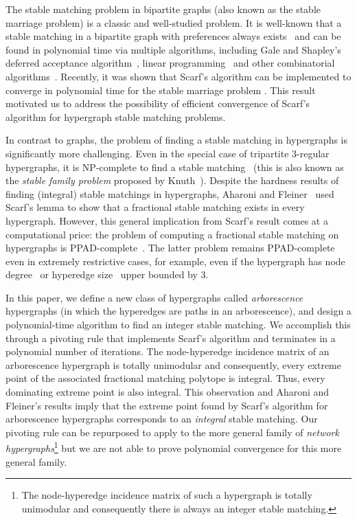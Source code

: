 \documentclass[11pt]{article}
\begin{document}
The stable matching problem in bipartite graphs (also known as the stable marriage problem) is a classic and well-studied problem. It is well-known that a stable matching in a bipartite graph with preferences always exists~\cite{gale1962college} and can be found in polynomial time via multiple algorithms, including Gale and Shapley's deferred acceptance algorithm~\cite{gale1962college}, linear programming~\cite{baiou2000stable,roth1993stable,rothblum1992characterization,teo1998geometry} and other combinatorial algorithms~\cite{baiou2002stable,dworczak2016deferred}. Recently, it was shown that Scarf's algorithm can be implemented to converge in polynomial time for the stable marriage problem \cite{faenza2023scarf}. This result motivated us to address the possibility of efficient convergence of Scarf's algorithm for hypergraph stable matching problems. 

In contrast to graphs, the problem of finding a stable matching in hypergraphs is significantly more challenging.  Even in the special case of tripartite $3$-regular hypergraphs, it is NP-complete to find a stable matching~\cite{ng1991three} (this is also known as the \emph{stable family problem} proposed by Knuth~\cite{knuth1976marriages}). Despite the hardness results of finding (integral) stable matchings in hypergraphs, Aharoni and Fleiner~\cite{aharoni2003lemma} used Scarf's lemma to show that a fractional stable matching exists in every hypergraph. 
However, this general implication from Scarf's result comes at a computational price: the problem of computing a fractional stable matching on hypergraphs is PPAD-complete~\cite{kintali2013reducibility}. The latter problem remains PPAD-complete even in extremely restrictive cases, for example, even if the hypergraph has node degree~\cite{ishizuka2018complexity} or hyperedge size~\cite{csaji2022complexity} upper bounded by $3$. 










In this paper, we define a new class of hypergraphs called {\em arborescence} hypergraphs (in which the hyperedges are paths in an arborescence), and design a polynomial-time algorithm to find an integer stable matching. We accomplish this through a pivoting rule that implements Scarf's algorithm and terminates in a polynomial number of iterations. The node-hyperedge incidence matrix of an arborescence hypergraph is totally unimodular and consequently, every extreme point of the associated fractional matching polytope is integral. Thus, every dominating extreme point is also integral. This observation and Aharoni and Fleiner's results imply that the extreme point found by Scarf's algorithm for arborescence hypergraphs corresponds to an \emph{integral} stable matching. Our pivoting rule can be repurposed to apply to the more general family of
{\em network hypergraphs}\footnote{The node-hyperedge incidence matrix of such a hypergraph is totally unimodular and consequently there is always an integer stable matching.} but we are not able to prove polynomial convergence for this more general family.
\end{document}

